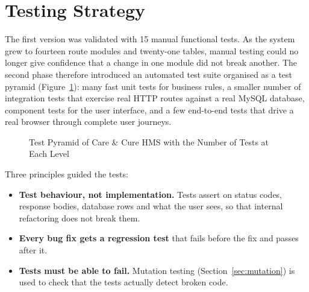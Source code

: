 \FloatBarrier
\section{Testing Strategy}

The first version was validated with 15 manual functional tests. As the system grew to fourteen route modules and twenty-one tables, manual testing could no longer give confidence that a change in one module did not break another. The second phase therefore introduced an automated test suite organised as a test pyramid \cite{cohn2009} (Figure~\ref{fig:pyramid}): many fast unit tests for business rules, a smaller number of integration tests that exercise real HTTP routes against a real MySQL database, component tests for the user interface, and a few end-to-end tests that drive a real browser through complete user journeys.

\begin{figure}[H]
\centering
{}
\caption{Test Pyramid of Care \& Cure HMS with the Number of Tests at Each Level}
\label{fig:pyramid}
\end{figure}

Three principles guided the tests:
\begin{itemize}
    \item \textbf{Test behaviour, not implementation.} Tests assert on status codes, response bodies, database rows and what the user sees, so that internal refactoring does not break them.
    \item \textbf{Every bug fix gets a regression test} that fails before the fix and passes after it.
    \item \textbf{Tests must be able to fail.} Mutation testing (Section~\ref{sec:mutation}) is used to check that the tests actually detect broken code.
\end{itemize}

